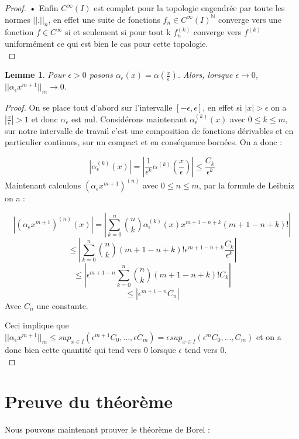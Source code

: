 \documentclass[12pt,a4paper]{amsart}
\newtheorem{lem}[thm]{\bf Lemme}
\begin{document}
\begin{proof}
\textbf{•} Enfin $C^{\infty}(I)$ est complet pour la topologie engendrée par toute les normes $||.||_{n}$, en effet une suite de fonctions $ f_{n} \in C^{\infty}(I)^{\mathbb{N}}$  converge vers une fonction $ f \in C^{\infty}$ si et seulement si pour tout k $ f_{n}^{(k)}$ converge vers $f^{(k)}$ uniformément ce qui est bien le cas pour cette topologie.\\
\end{proof}

\begin{lem} Pour $\epsilon>0 $ posons $\alpha_{\epsilon}(x)= \alpha(\frac{x}{\epsilon})$. Alors, lorsque $ \epsilon \rightarrow 0$, $||\alpha_{\epsilon} x^{m+1}||_{m} \rightarrow 0$. 
\end{lem}

\begin{proof}

On se place tout d'abord sur l'intervalle $[-\epsilon, \epsilon]$, en effet si $|x|>\epsilon$ on a $|\frac{x}{\epsilon}|>1$ et donc $\alpha_{\epsilon}$ est nul. Considérons maintenant $\alpha_{\epsilon}^{(k)}(x)$ avec $0\leq k\leq m$, sur notre intervalle de travail c'est une composition de fonctions dérivables et en particulier continues, sur un compact et en conséquence bornées. On a donc : 

$$|\alpha_{\epsilon}^{(k)}(x)|= \left|\dfrac{1}{\epsilon^{k}} \alpha^{(k)}\left(\dfrac{x}{\epsilon}\right)\right|\leq \dfrac{C_{k}}{\epsilon^{k}}$$
Maintenant calculons $(\alpha_{\epsilon} x^{m+1})^{(n)}$ avec $0\leq n \leq m$, par la formule de Leibniz on a : 

$$|(\alpha_{\epsilon} x^{m+1})^{(n)} (x)| = |\sum_{k=0}^{n} \binom{n}{k} \alpha_{\epsilon}^{(k)}(x) x^{m+1-n+k} (m+1-n+k)!|$$
$$\leq |\sum_{k=0}^{n} \binom{n}{k} (m+1-n+k)! \epsilon^{m+1-n+k} \dfrac{C_{k}}{\epsilon^{k}}|$$
$$\leq |\epsilon^{m+1-n} \sum_{k=0}^{n} \binom{n}{k} (m+1-n+k)! C_{k}|$$
$$\leq |\epsilon^{m+1-n} C_{n}|$$
Avec $C_{n}$ une constante. 

Ceci implique que $||\alpha_{\epsilon} x^{m+1}||_{m}\leq sup_{x \in I}( \epsilon^{m+1} C_{0}, ..., \epsilon C_{m})= \epsilon sup_{x \in I}( \epsilon^{m} C_{0}, ...,  C_{m})$ et on a donc bien cette quantité qui tend vers 0 lorsque $\epsilon$ tend vers 0. \\
\end{proof}
\section{Preuve du théorème}
Nous pouvons maintenant prouver le théorème de Borel : \\
\end{document}
